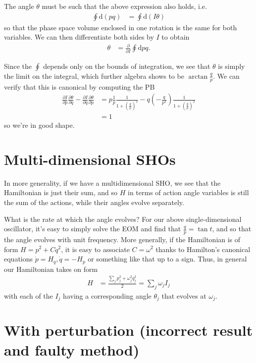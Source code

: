 \documentclass[12pt]{report}
\newcommand*{\pd}[2]{\frac{\partial#1}{\partial#2}}
\begin{document}
The angle $\theta$ must be such that the above expression also holds, i.e.
\begin{align}
    \oint \mathrm{d}(pq) &= \oint \mathrm{d}(I\theta)
\end{align}
so that the phase space volume enclosed in one rotation is the same for both
variables. We can then differentiate both sides by $I$ to obtain
\begin{align}
    \theta &= \pd{}{I}\oint \mathrm{d}pq.
\end{align}

Since the $\oint$ depends only on the bounds of integration, we see that
$\theta$ is simply the limit on the integral, which further algebra shows to be
$\arctan \frac{q}{p}$. We can verify that this is canonical by computing the PB
\begin{align}
    \pd{I}{p}\pd{\theta}{q} - \pd{I}{q}\pd{\theta}{p} &=
        p \frac{1}{p}\frac{1}{1 + \left( \frac{q}{p} \right)^2} -
        q \left( - \frac{q}{p^2} \right)
        \frac{1}{1 + \left( \frac{q}{p} \right)^2}\\
    &= 1
\end{align}
so we're in good shape.

\section{Multi-dimensional SHOs}

In more generality, if we have a multidimensional SHO, we see that the
Hamiltonian is just their sum, and so $H$ in terms of action angle variables is
still the sum of the actions, while their angles evolve separately.

What is the rate at which the angle evolves? For our above single-dimensional
oscillator, it's easy to simply solve the EOM and find that $\frac{q}{p} = \tan
t$, and so that the angle evolves with unit frequency. More generally, if the
Hamiltonian is of form $H = p^2 + Cq^2$, it is easy to associate $C = \omega^2$
thanks to Hamilton's canonical equations $\dot{p} = H_q, \dot{q} = -H_p$ or
something like that up to a sign. Thus, in general our Hamiltonian takes on form
\begin{align}
    H &= \frac{\sum_j p_j^2 + \omega_j^2q_j^2}{2} = \sum_j \omega_j I_j
\end{align}
with each of the $I_j$ having a corresponding angle $\theta_j$ that evolves at
$\omega_j$.

\section{With perturbation (incorrect result and faulty method)}
\end{document}
